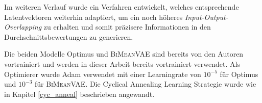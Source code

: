 Im weiteren Verlauf wurde ein Verfahren entwickelt, welches entsprechende Latentvektoren weiterhin adaptiert, um ein noch höheres \textit{Input-Output-Overlapping} zu erhalten und somit präzisere Informationen in den Durchschnittsbewertungen zu generieren.

Die beiden Modelle Optimus und \textsc{BiMeanVAE} sind bereits von den Autoren \citep{coop} vortrainiert und werden in dieser Arbeit bereits vortrainiert verwendet. 
Als Optimierer wurde Adam verwendet mit einer Learningrate von $10^{-5}$ für Optimus und $10^{-3}$ für \textsc{BiMeanVAE}.
Die Cyclical Annealing Learning Strategie wurde wie in Kapitel \ref{cyc_anneal} beschrieben angewandt.


\pagebreak
